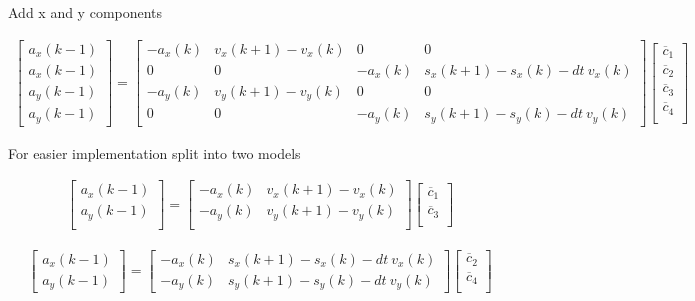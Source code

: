 \documentclass[10pt]{article}         %
\begin{document}
Add x and y components

\begin{align}
    \begin{bmatrix}
        a_x(k-1) \\ 
        a_x(k-1) \\ 
        a_y(k-1) \\ 
        a_y(k-1)       
    \end{bmatrix}
    =
    \begin{bmatrix}
        -a_x(k)  & v_x(k+1) - v_x(k)  & 0 & 0                   \\ 
        0 & 0 & -a_x(k) &    s_x(k+1) - s_x(k) - dt \  v_x(k)   \\ 
        -a_y(k)  & v_y(k+1) - v_y(k)  & 0 & 0                   \\
        0 & 0 & -a_y(k) &    s_y(k+1) - s_y(k) - dt \  v_y(k)
    \end{bmatrix}
    \begin{bmatrix}
        \overline c_1 \\
        \overline c_2 \\
        \overline c_3 \\
        \overline c_4 \\
   \end{bmatrix}
\end{align}

For easier implementation split into two models

\begin{align}
    \begin{bmatrix}
        a_x(k-1) \\ 
        a_y(k-1) \\ 
    \end{bmatrix}
    =
    \begin{bmatrix}
        -a_x(k)  & v_x(k+1) - v_x(k)   \\ 
        -a_y(k)  & v_y(k+1) - v_y(k)   \\
    \end{bmatrix}
    \begin{bmatrix}
        \overline c_1 \\
        \overline c_3 \\
   \end{bmatrix}
\end{align}



\begin{align}
    \begin{bmatrix}
        a_x(k-1) \\ 
        a_y(k-1)       
    \end{bmatrix}
    =
    \begin{bmatrix}
        -a_x(k) &    s_x(k+1) - s_x(k) - dt \  v_x(k)   \\ 
        -a_y(k) &    s_y(k+1) - s_y(k) - dt \  v_y(k)
    \end{bmatrix}
    \begin{bmatrix}
        \overline c_2 \\
        \overline c_4 \\
   \end{bmatrix}
\end{align}
\end{document}
